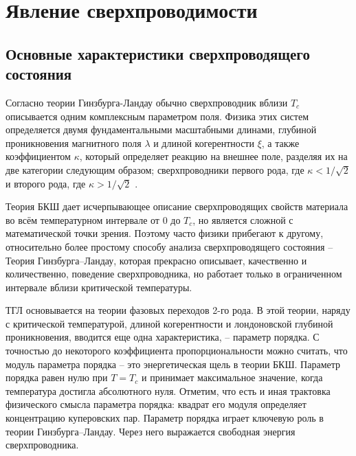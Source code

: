 \chapter{Явление сверхпроводимости}

\section{Основные характеристики сверхпроводящего состояния}

Согласно теории Гинзбурга-Ландау обычно сверхпроводник вблизи \( T_c \) 
описывается одним комплексным параметром поля. Физика этих систем определяется 
двумя фундаментальными масштабными длинами, глубиной проникновения магнитного 
поля \( \lambda \) и длиной когерентности \( \xi \), а также коэффициентом 
\( \kappa \), который определяет реакцию на внешнее поле, разделяя их на две  
категории следующим образом; сверхпроводники первого рода, где 
\( \kappa < 1/\sqrt{2} \) и второго рода, где \( \kappa > 1/\sqrt{2} \) 
\cite{bib:3}.

Теория БКШ дает исчерпывающее описание сверхпроводящих свойств материала во 
всём температурном интервале от \( 0 \) до \( T_c \), но является сложной с 
математической точки зрения. Поэтому часто физики прибегают к другому, 
относительно более простому способу анализа сверхпроводящего состояния -- 
Теория Гинзбурга–Ландау, которая прекрасно описывает, качественно и 
количественно, поведение сверхпроводника, но работает только в ограниченном 
интервале вблизи критической температуры.

ТГЛ основывается на теории фазовых переходов 2-го рода. В этой теории, наряду 
с критической температурой, длиной когерентности и лондоновской глубиной 
проникновения, вводится еще одна характеристика, -- параметр порядка. С 
точностью до некоторого коэффициента пропорциональности можно считать, что 
модуль параметра порядка -- это энергетическая щель в теории БКШ. Параметр 
порядка равен нулю при \( T = T_c \) и принимает максимальное значение, когда 
температура достигла абсолютного нуля. Отметим, что есть и иная трактовка 
физического смысла параметра порядка: квадрат его модуля определяет 
концентрацию куперовских пар. Параметр порядка играет ключевую роль в теории 
Гинзбурга–Ландау. Через него выражается свободная энергия сверхпроводника. 
\cite{bib:net}

